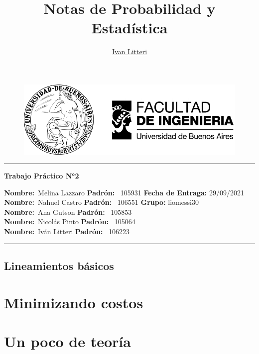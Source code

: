\documentclass[hidelinks]{report}
\title{Notas de Probabilidad y Estadística}
\author{\href{https://github.com/ilitteri}{Ivan Litteri}}
\date{}
\begin{document}
	
\begin{figure}
	\centering
	\includegraphics{../assets/banner_fiuba.pdf}
\end{figure}

\begin{center}
	\hrule
	\vspace{.4cm}
	{\textbf { \large Trabajo Práctico N°2}}
\end{center}
{\textbf{Nombre:}\ Melina Lazzaro \textbf{Padrón:}} \ 105931 \hspace{\fill} \textbf{Fecha de Entraga:} 29/09/2021   \\
{\textbf{Nombre:}\ Nahuel Castro \textbf{Padrón:}} \ 106551 \hspace{\fill} \textbf{Grupo:} liomessi30   \\
{\textbf{Nombre:}\ Ana Gutson  \textbf{Padrón:}} \ 105853 \hspace{\fill}    \\
{\textbf{Nombre:}\ Nicolás Pinto  \textbf{Padrón:}} \ 105064 \hspace{\fill}    \\
{\textbf{Nombre:}\ Iván Litteri  \textbf{Padrón:}} \ 106223 \hspace{\fill}    \\
	\hrule

\section*{Lineamientos básicos}


\tableofcontents
\clearpage

\chapter{Minimizando costos}

\clearpage

\chapter{Un poco de teoría}

\clearpage
\end{document}
